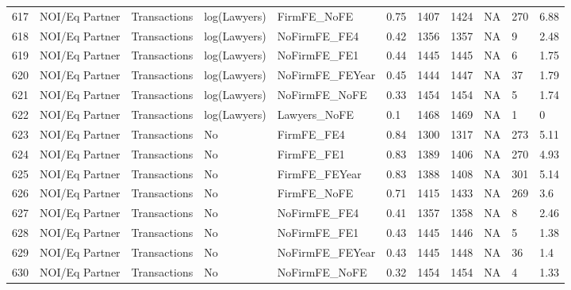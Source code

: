\documentclass{article}
\begin{document}
\begin{table}[H]
\begin{tabular}{rllllllllll}
  617 & NOI/Eq Partner & Transactions & log(Lawyers) & FirmFE\_NoFE & 0.75 & 1407 & 1424 & NA & 270 & 6.88 \\
  618 & NOI/Eq Partner & Transactions & log(Lawyers) & NoFirmFE\_FE4 & 0.42 & 1356 & 1357 & NA & 9 & 2.48 \\
  619 & NOI/Eq Partner & Transactions & log(Lawyers) & NoFirmFE\_FE1 & 0.44 & 1445 & 1445 & NA & 6 & 1.75 \\
  620 & NOI/Eq Partner & Transactions & log(Lawyers) & NoFirmFE\_FEYear & 0.45 & 1444 & 1447 & NA & 37 & 1.79 \\
  621 & NOI/Eq Partner & Transactions & log(Lawyers) & NoFirmFE\_NoFE & 0.33 & 1454 & 1454 & NA & 5 & 1.74 \\
  622 & NOI/Eq Partner & Transactions & log(Lawyers) & Lawyers\_NoFE & 0.1 & 1468 & 1469 & NA & 1 & 0 \\
  623 & NOI/Eq Partner & Transactions & No & FirmFE\_FE4 & 0.84 & 1300 & 1317 & NA & 273 & 5.11 \\
  624 & NOI/Eq Partner & Transactions & No & FirmFE\_FE1 & 0.83 & 1389 & 1406 & NA & 270 & 4.93 \\
  625 & NOI/Eq Partner & Transactions & No & FirmFE\_FEYear & 0.83 & 1388 & 1408 & NA & 301 & 5.14 \\
  626 & NOI/Eq Partner & Transactions & No & FirmFE\_NoFE & 0.71 & 1415 & 1433 & NA & 269 & 3.6 \\
  627 & NOI/Eq Partner & Transactions & No & NoFirmFE\_FE4 & 0.41 & 1357 & 1358 & NA & 8 & 2.46 \\
  628 & NOI/Eq Partner & Transactions & No & NoFirmFE\_FE1 & 0.43 & 1445 & 1446 & NA & 5 & 1.38 \\
  629 & NOI/Eq Partner & Transactions & No & NoFirmFE\_FEYear & 0.43 & 1445 & 1448 & NA & 36 & 1.4 \\
  630 & NOI/Eq Partner & Transactions & No & NoFirmFE\_NoFE & 0.32 & 1454 & 1454 & NA & 4 & 1.33 \\
   \hline
\end{tabular}
\end{table}
\end{document}
